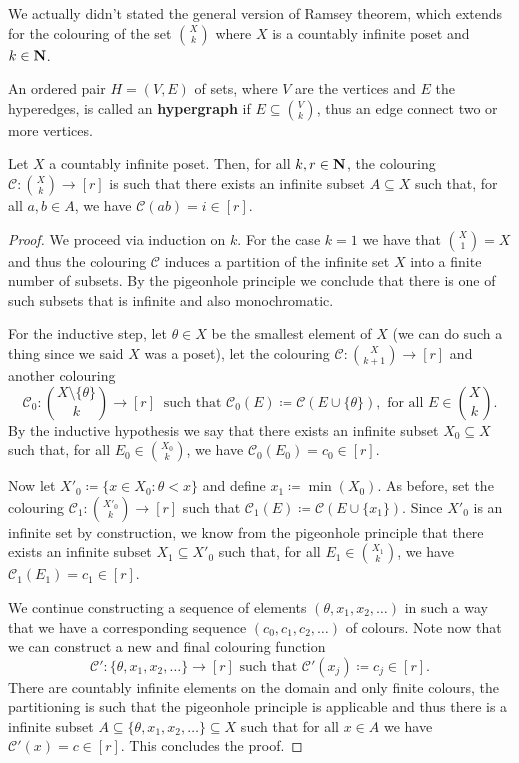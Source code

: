 We actually didn't stated the general version of Ramsey theorem, which extends
for the colouring of the set \(\binom{X}{k}\) where \(X\) is a countably infinite
poset and \(k \in \mathbf{N}\).

\begin{definition}[Hypergraph]
An ordered pair \(H = (V, E)\) of sets, where \(V\) are the vertices and
\(E\) the hyperedges, is called an \textbf{hypergraph} if \(E \subseteq
\binom{V}{k}\), thus an edge connect two or more vertices.
\end{definition}

\begin{theorem}
Let \(X\) a countably infinite poset. Then, for all \(k, r \in \mathbf{N}\), the
colouring \(\mathcal{C} : \binom{X}{k} \to [r]\) is such that there exists an
infinite subset \(A \subseteq X\) such that, for all \(a, b \in A\), we
have \(\mathcal{C}(a b) = i \in [r]\).
\end{theorem}

\begin{proof}
We proceed via induction on \(k\). For the case \(k = 1\) we have that
\(\binom{X}{1} = X\) and thus the colouring \(\mathcal{C}\) induces a
partition of the infinite set \(X\) into a finite number of subsets. By the
pigeonhole principle we conclude that there is one of such subsets that is
infinite and also monochromatic.

For the inductive step, let \(\theta \in X\) be the smallest element of \(X\)
(we can do such a thing since we said \(X\) was a poset), let the colouring
\(\mathcal{C} : \binom{X}{k + 1} \to [r]\) and another colouring
\[
    \mathcal{C}_0 : \binom{X \setminus \{\theta\} }{k} \longrightarrow [r]
    \ \text{ such that }
    \mathcal{C}_0(E) \coloneq \mathcal{C}(E \cup \{\theta\} ), \text{ for all }
    E \in \binom{X}{k}.
\]
By the inductive hypothesis we say that there exists an infinite subset \(X_0
\subseteq X\) such that, for all \(E_0 \in \binom{X_0}{k}\), we have
\(\mathcal{C}_0(E_0) = c_0 \in [r]\).

Now let \(X'_0 \coloneq \{x \in X_0 \colon \theta < x\}\) and define \(x_1
\coloneq \min(X_0)\). As before, set the colouring \(\mathcal{C}_1 :
\binom{X'_0}{k} \to [r]\) such that \(\mathcal{C}_1(E) \coloneq \mathcal{C}(E
\cup \{x_1\})\).  Since \(X'_0\) is an infinite set by construction, we know
from the pigeonhole principle that there exists an infinite subset \(X_1
\subseteq X'_0\) such that, for all \(E_1 \in \binom{X_1}{k}\), we have
\(\mathcal{C}_1 (E_1) = c_1 \in [r]\).

We continue constructing a sequence of elements \((\theta, x_1, x_2, \dots)\)
in such a way that we have a corresponding sequence \((c_0, c_1, c_2, \dots)\)
of colours. Note now that we can construct a new and final colouring function
\[
    \mathcal{C}' : \{\theta, x_1, x_2, \dots\} \to [r] \text{ such that }
    \mathcal{C}'(x_j) \coloneq c_j \in [r].
\]
There are countably infinite elements on the domain and only finite colours, the
partitioning is such that the pigeonhole principle is applicable and thus there
is a infinite subset \(A \subseteq \{\theta, x_1, x_2, \dots\} \subseteq X\)
such that for all \(x \in A\) we have \(\mathcal{C}'(x) = c \in [r]\).  This
concludes the proof.
\end{proof}
